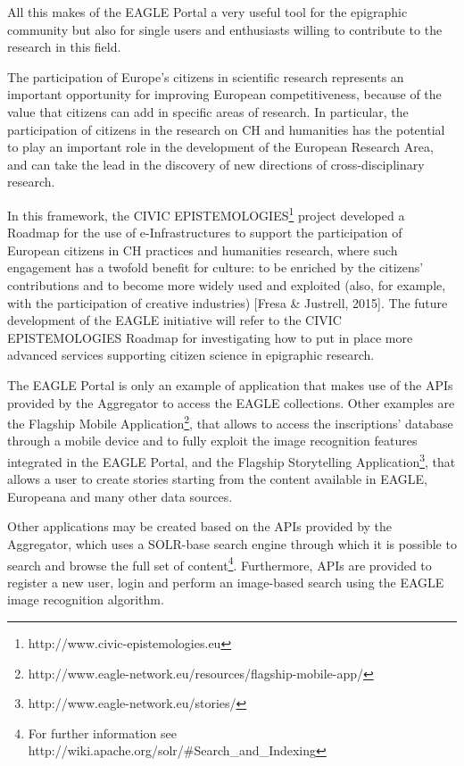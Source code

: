 \documentclass[amsthm,ebook]{saparticle}
\begin{document}
All this makes of the EAGLE Portal a very useful tool for the epigraphic community but also for single users and
enthusiasts willing to contribute to the research in this field.

The participation of Europe’s citizens in scientific research represents an important opportunity for improving European
competitiveness, because of the value that citizens can add in specific areas of research. In particular, the
participation of citizens in the research on CH and humanities has the potential to play an important role in the
development of the European Research Area, and can take the lead in the discovery of new directions of
cross-disciplinary research.

In this framework, the CIVIC EPISTEMOLOGIES\footnote{ http://www.civic-epistemologies.eu } project developed a Roadmap
for the use of e-Infrastructures to support the participation of European citizens in CH practices and humanities
research, where such engagement has a twofold benefit for culture: to be enriched by the citizens’ contributions and to
become more widely used and exploited (also, for example, with the participation of creative industries) [Fresa \&
Justrell, 2015]. The future development of the EAGLE initiative will refer to the CIVIC EPISTEMOLOGIES Roadmap for
investigating how to put in place more advanced services supporting citizen science in epigraphic research.

The EAGLE Portal is only an example of application that makes use of the APIs provided by the Aggregator to access the
EAGLE collections. Other examples are the Flagship Mobile Application\footnote{
http://www.eagle-network.eu/resources/flagship-mobile-app/ }, that allows to access the inscriptions’ database through
a mobile device and to fully exploit the image recognition features integrated in the EAGLE Portal, and the Flagship
Storytelling Application\footnote{ http://www.eagle-network.eu/stories/ }, that allows a user to create stories
starting from the content available in EAGLE, Europeana and many other data sources.

Other applications may be created based on the APIs provided by the Aggregator, which uses a SOLR-base search engine
through which it is possible to search and browse the full set of content\footnote{ For further information see
http://wiki.apache.org/solr/\#Search\_and\_Indexing }. Furthermore, APIs are provided to register a new user, login and
perform an image-based search using the EAGLE image recognition algorithm.




\end{document}
